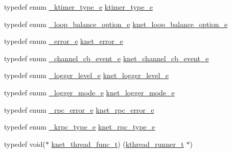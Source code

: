 \begin{DoxyCompactItemize}
\item 
typedef enum \hyperlink{a00051_a7945681f6589a5f4f6cf55f4f4092d28_a7945681f6589a5f4f6cf55f4f4092d28}{\+\_\+ktimer\+\_\+type\+\_\+e} \hyperlink{a00051_a42e924130e6eb3bd995344f6d3f3e918_a42e924130e6eb3bd995344f6d3f3e918}{ktimer\+\_\+type\+\_\+e}
\item 
typedef enum \hyperlink{a00051_a0f82b35b603ffed92ea1a74205f10781_a0f82b35b603ffed92ea1a74205f10781}{\+\_\+loop\+\_\+balance\+\_\+option\+\_\+e} \hyperlink{a00051_aa131da8fb72468b39b6ee0e2d46b17b2_aa131da8fb72468b39b6ee0e2d46b17b2}{knet\+\_\+loop\+\_\+balance\+\_\+option\+\_\+e}
\item 
typedef enum \hyperlink{a00051_ad8bc998d415be9115a064a8307df0ed5_ad8bc998d415be9115a064a8307df0ed5}{\+\_\+error\+\_\+e} \hyperlink{a00051_abc9a047a9545c201adf70e4793ed0689_abc9a047a9545c201adf70e4793ed0689}{knet\+\_\+error\+\_\+e}
\item 
typedef enum \hyperlink{a00051_a2217ac7363dbae279d056a361d122915_a2217ac7363dbae279d056a361d122915}{\+\_\+channel\+\_\+cb\+\_\+event\+\_\+e} \hyperlink{a00051_a2fd2faf971268f5b682ab375c455f7c9_a2fd2faf971268f5b682ab375c455f7c9}{knet\+\_\+channel\+\_\+cb\+\_\+event\+\_\+e}
\item 
typedef enum \hyperlink{a00051_a4e764c733cf98ee587ca17412fca9148_a4e764c733cf98ee587ca17412fca9148}{\+\_\+logger\+\_\+level\+\_\+e} \hyperlink{a00051_a8bb61ec2ff976625d0707a81c1ccc149_a8bb61ec2ff976625d0707a81c1ccc149}{knet\+\_\+logger\+\_\+level\+\_\+e}
\item 
typedef enum \hyperlink{a00051_a95d677e6aef6e1699b92848e4497c23a_a95d677e6aef6e1699b92848e4497c23a}{\+\_\+logger\+\_\+mode\+\_\+e} \hyperlink{a00051_a3ad8e017e53143bca2ada78d2bfa30e1_a3ad8e017e53143bca2ada78d2bfa30e1}{knet\+\_\+logger\+\_\+mode\+\_\+e}
\item 
typedef enum \hyperlink{a00051_a5a9afdfc8281994f0692b49499d731bf_a5a9afdfc8281994f0692b49499d731bf}{\+\_\+rpc\+\_\+error\+\_\+e} \hyperlink{a00051_a09f6be2164ffa374198a4ab2af2e1966_a09f6be2164ffa374198a4ab2af2e1966}{knet\+\_\+rpc\+\_\+error\+\_\+e}
\item 
typedef enum \hyperlink{a00051_aa250e66ac76155c15e3e1d24d0431931_aa250e66ac76155c15e3e1d24d0431931}{\+\_\+krpc\+\_\+type\+\_\+e} \hyperlink{a00051_a6fe1ebc0ddea56dd3c337115c1e10bc4_a6fe1ebc0ddea56dd3c337115c1e10bc4}{knet\+\_\+rpc\+\_\+type\+\_\+e}
\item 
typedef void($\ast$ \hyperlink{a00051_a8741dac4a9f8d97603eb3a30a3473b13_a8741dac4a9f8d97603eb3a30a3473b13}{knet\+\_\+thread\+\_\+func\+\_\+t}) (\hyperlink{a00051_a4f78c259c9527c821f1a6f87495dd339_a4f78c259c9527c821f1a6f87495dd339}{kthread\+\_\+runner\+\_\+t} $\ast$)

\end{DoxyCompactItemize}

